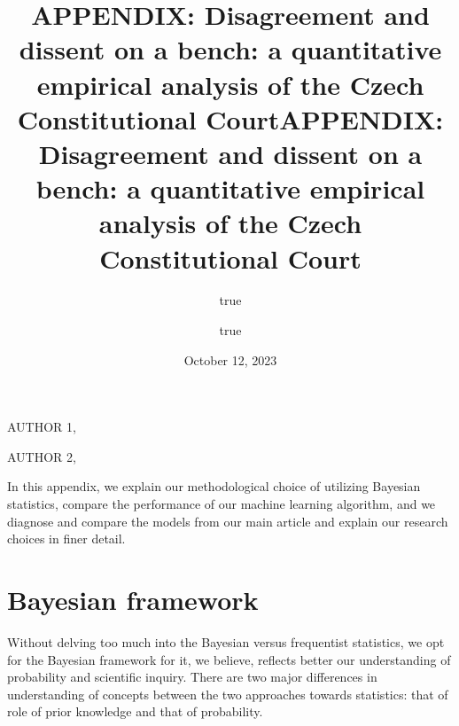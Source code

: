 \documentclass[
  11pt,
]{article}
\title{APPENDIX: Disagreement and dissent on a bench: a quantitative
empirical analysis of the Czech Constitutional Court}
\author{true \and true}
\date{October 12, 2023}
\title{APPENDIX: Disagreement and dissent on a bench: a quantitative
empirical analysis of the Czech Constitutional Court }
\date{}
\begin{document}



{%
\setlength{\parindent}{0pt}
\thispagestyle{plain}
{%
\maketitle  %

}




{
   \vskip 13.5pt\relax \normalsize\fontsize{11}{12}
   \MakeUppercase{Author
1}, \small{}   \par \vskip -3.5pt \MakeUppercase{Author 2}, \small{}   

}

}






\vskip -8.5pt




\setlength{\parindent}{16pt}
\setlength{\parskip}{0pt}

\doublespacing
\vspace{30pt}

In this appendix, we explain our methodological choice of utilizing
Bayesian statistics, compare the performance of our machine learning
algorithm, and we diagnose and compare the models from our main article
and explain our research choices in finer detail.

\hypertarget{bayesian-framework}{%
\section{Bayesian framework}\label{bayesian-framework}}

Without delving too much into the Bayesian versus frequentist
statistics, we opt for the Bayesian framework for it, we believe,
reflects better our understanding of probability and scientific inquiry.
There are two major differences in understanding of concepts between the
two approaches towards statistics: that of role of prior knowledge and
that of probability.
\end{document}
